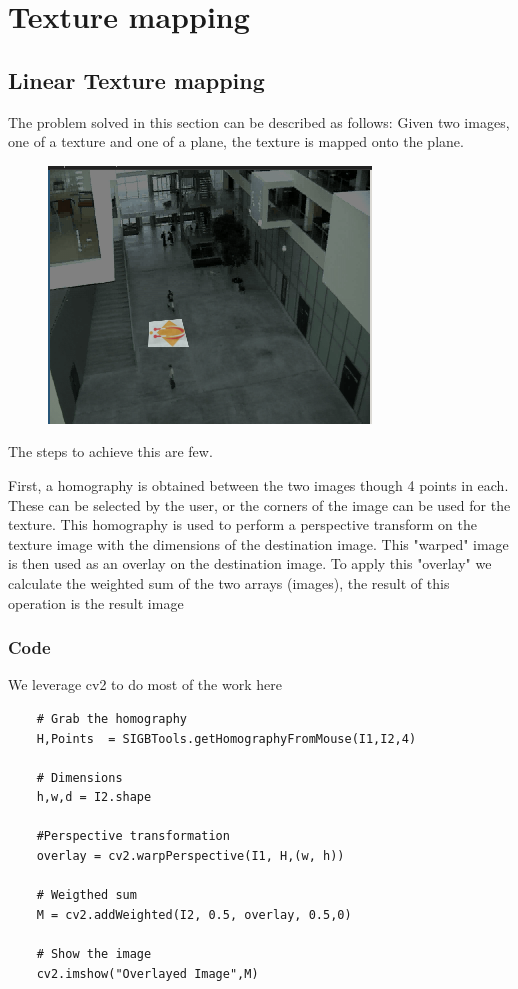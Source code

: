 \section{Texture mapping}

\subsection{Linear Texture mapping}
The problem solved in this section can be described as follows:
\newline
Given two images, one of a texture and one of a plane, the texture is
mapped onto the plane. 

\begin{figure}[H]
    \includegraphics{pics/mapping.png}
    \label{mapping}
\end{figure}

The steps to achieve this are few. 

First, a homography is obtained between the two images though 4 points in each.
These can be selected by the user, or the corners of the image can be used
for the texture. This homography is used to perform a perspective
transform on the texture image with the dimensions of the destination
image. This "warped" image is then used as an overlay on the destination
image. To apply this "overlay" we calculate the weighted sum of the two
arrays (images), the result of this operation is the result image

\subsubsection{Code}
We leverage cv2 to do most of the work here

\begin{verbatim}
    # Grab the homography
    H,Points  = SIGBTools.getHomographyFromMouse(I1,I2,4)
    
    # Dimensions
    h,w,d = I2.shape

    #Perspective transformation
    overlay = cv2.warpPerspective(I1, H,(w, h))

    # Weigthed sum
    M = cv2.addWeighted(I2, 0.5, overlay, 0.5,0)
    
    # Show the image
    cv2.imshow("Overlayed Image",M)

\end{verbatim}

